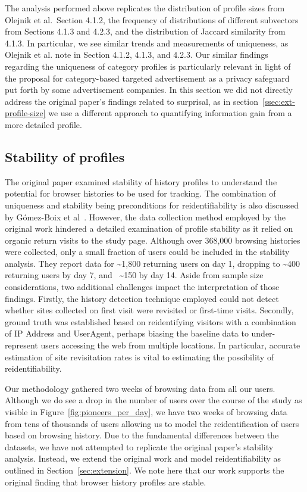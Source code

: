 \documentclass[letterpaper,twocolumn,10pt]{article}
\begin{document}
The analysis performed above replicates the distribution of profile sizes from Olejnik et al.~Section 4.1.2, the frequency of distributions of different subvectors from Sections 4.1.3 and 4.2.3, and the distribution of Jaccard similarity from 4.1.3. In particular, we see similar trends and measurements of uniqueness, as Olejnik et al. note in Section 4.1.2, 4.1.3, and 4.2.3. 
Our similar findings regarding the uniqueness of category profiles is particularly relevant in light of the proposal for category-based targeted advertisement as a privacy safeguard put forth by some advertisement companies\cite{IAB-press-1, ICO-UK-2019}. 
In this section we did not directly address the original paper's findings related to surprisal, as in section~\ref{ssec:ext-profile-size} we use a different approach to quantifying information gain from a more detailed profile. 

\subsection{Stability of profiles}
\label{ssec:repro-stability}
The original paper examined stability of history profiles to understand the potential for browser histories to be used for tracking. 
The combination of uniqueness and stability being preconditions for reidentifiability is also discussed by G\'{o}mez-Boix et al~\cite{10.1145/3178876.3186097}.
However, the data collection method employed by the original work hindered a detailed examination of profile stability as it relied on organic return visits to the study page.  
Although over 368,000 browsing histories were collected, only a small fraction of users could be included in the stability analysis. 
They report data for \textasciitilde{1,800} returning users on day 1, dropping to \textasciitilde{400} returning users by day 7, and ~\textasciitilde{150} by day 14.
Aside from sample size considerations, two additional challenges impact the interpretation of those findings. 
Firstly, the history detection technique employed could not detect whether sites collected on first visit were revisited or first-time visits. 
Secondly, ground truth was established based on reidentifying visitors with a combination of IP Address and UserAgent, perhaps biasing the baseline data to under-represent users accessing the web from multiple locations.
In particular, accurate estimation of site revisitation rates is vital to estimating the possibility of reidentifiability.

Our methodology gathered two weeks of browsing data from all our users.  
Although we do see a drop in the number of users over the course of the study as visible in Figure~\ref{fig:pioneers_per_day}, we have two weeks of browsing data from tens of thousands of users allowing us to model the reidentification of users based on browsing history.
Due to the fundamental differences between the datasets, we have not attempted to replicate the original paper's stability analysis. 
Instead, we extend the original work and model reidentifiability as outlined in Section~\ref{sec:extension}. 
We note here that our work supports the original finding that browser history profiles are stable.
%
\end{document}
